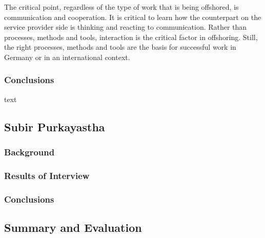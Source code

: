 The critical point, regardless of the type of work that is being offshored, is communication and cooperation. It is critical to learn how the counterpart on the service provider side is thinking and reacting to communication. Rather than processes, methods and tools, interaction is the critical factor in offshoring. Still, the right processes, methods and tools are the basis for successful work in Germany or in an international context.


\subsubsection{Conclusions}
text
\subsection{Subir Purkayastha}
\subsubsection{Background}
\subsubsection{Results of Interview}
\subsubsection{Conclusions}


\subsection{Summary and Evaluation}
